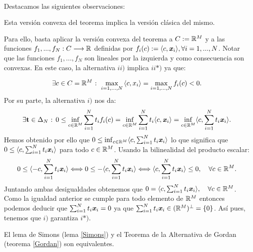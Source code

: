 	\paragraph{} Destacamos las siguientes observaciones:
	
	\begin{observacion}
		Esta versión convexa del teorema implica la versión clásica del mismo.
	\end{observacion}

	Para ello, basta aplicar la versión convexa del teorema a $ C := \mathbb{R}^M $ y a las funciones $ f_1,...,f_N : C \longrightarrow \mathbb{R} $ definidas por $ f_i(c):=\langle c, \textbf{\emph{x}}_i \rangle , \forall i=1,...,N  $. Notar que las funciones $ f_1,...,f_N $ son lineales por la izquierda y como consecuencia son convexas. En este caso, la alternativa $ ii) $ implica $ ii*) $ ya que:
	
	\begin{equation*}
		\exists c \in C = \mathbb{R}^M \text{ : } \max_{i=1,...,N} {\langle c,x_i \rangle}  =  \max_{i=1,...,N}f_i (c) < 0 .
	\end{equation*}
	Por su parte, la alternativa $ i) $ nos da:
	\begin{equation*}
		\exists \mathbf{t} \in \Delta_N \text{ : } 0 \leq \inf_{c \in \mathbb{R}^M}  \sum_{i=1}^{N}{t_i f_i(c) } = \inf_{c \in \mathbb{R}^M} \sum_{i=1}^{N}{t_i\langle c, \textbf{\emph{x}}_i \rangle} = \inf_{c \in \mathbb{R}^M} \langle c, \sum_{i=1}^{N}{t_i 	\textbf{\emph{x}}_i} \rangle. 
	\end{equation*}
	Hemos obtenido por ello que  $0  \leq \inf_{c \in \mathbb{R}^M} \langle c, \sum_{i=1}^{N}{t_i \textbf{\emph{x}}_i} \rangle  $ lo que significa que $ 0 \leq \langle c, \sum_{i=1}^{N}{t_i \textbf{\emph{x}}_i} \rangle  $ para todo $ c \in \mathbb{R}^M $. Usando la bilinealidad del producto escalar:
	\[
	0 \leq \langle -c, \sum_{i=1}^{N}{t_i \textbf{\emph{x}}_i} \rangle \Longleftrightarrow 	0 \leq -\langle c, \sum_{i=1}^{N}{t_i \textbf{\emph{x}}_i} \rangle 
	\Longleftrightarrow  \langle c, \sum_{i=1}^{N}{t_i \textbf{\emph{x}}_i}\rangle \leq 0, \quad \forall c \in \mathbb{R}^M.
	\]
	Juntando ambas desigualdades obtenemos que $ 0 =  \langle c, \sum_{i=1}^{N}{t_i \textbf{\emph{x}}_i}\rangle, \quad \forall c \in \mathbb{R}^M $. Como la igualdad anterior se cumple para todo elemento de $ \mathbb{R}^M $ entonces podemos deducir que $ \sum_{i=1}^{N}{t_i \textbf{\emph{x}}_i} = 0 $	ya que $ \sum_{i=1}^{N}{t_i \textbf{\emph{x}}_i} \in (\mathbb{R}^M)^{\perp} = \{0\} $. Así pues, tenemos que $ i) $ garantiza $ i*) $.
	
	\begin{observacion}
		El lema de Simons (lema \ref{Simons}) y el Teorema de la Alternativa de Gordan (teorema \ref{Gordan}) son equivalentes.
	\end{observacion}

